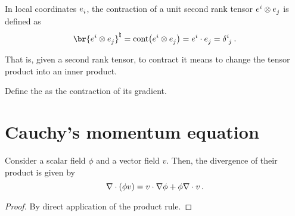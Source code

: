 \begin{definition}
  In local coordinates $\tbvec i$, the contraction of a unit second rank tensor $\tbcov i\tprod\tbvec j$ is defined as
  \begin{equation}\label{eqn:contraction--unit-second-rank-tensor}
    \cont{\br{\tbcov i\tprod\tbvec j}}
    = \ocont\vat{\tbcov i\tprod\tbvec j}
    = \tbcov i\iprod\tbvec j
    = \tkron ij\,.
  \end{equation}
\end{definition}
%
That is, given a second rank tensor, to contract it means to change the tensor product into an inner product.

\begin{definition}
  Define the  as the contraction of its gradient.
\end{definition}


\section{Cauchy's momentum equation}
\label{sec:cauchy-momentum-equation}

\begin{theorem}
  Consider a scalar field $\phi$ and a vector field $v$. Then, the divergence of their product is given by
  \begin{equation}\label{eqn:divergence-scalar-vector-product}
    \odiv\vat{\phi v} = v\iprod\ograd\phi + \phi\odiv v\,.
  \end{equation}
\end{theorem}
%
\begin{proof}
  By direct application of the product rule.
\end{proof}

